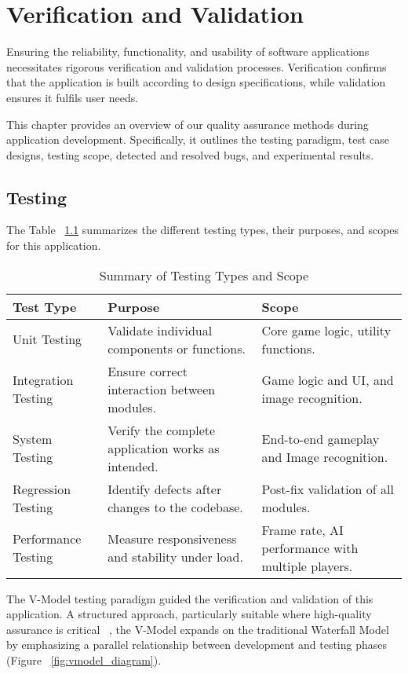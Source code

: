 \chapter{Verification and Validation}
\label{chap:verification-and-validation}

Ensuring the reliability, functionality, and usability of software applications necessitates rigorous verification and validation processes. Verification confirms that the application is built according to design specifications, while validation ensures it fulfils user needs.

This chapter provides an overview of our quality assurance methods during application development. Specifically, it outlines the testing paradigm, test case designs, testing scope, detected and resolved bugs, and experimental results.

\section{Testing}
The Table ~\ref{tab:testing_summary} summarizes the different testing types, their purposes, and scopes for this application.

\begin{table}[ht!]
    \centering
    \caption{Summary of Testing Types and Scope}
    \label{tab:testing_summary}
    \begin{tabular}{|p{4cm}|p{4cm}|p{4cm}|}
    \hline
    \textbf{Test Type} & \textbf{Purpose} & \textbf{Scope} \\ \hline
    Unit Testing       & Validate individual components or functions. & Core game logic, utility functions. \\ \hline
    Integration Testing & Ensure correct interaction between modules. & Game logic and UI, and image recognition. \\ 
    \hline
    System Testing     & Verify the complete application works as intended. & End-to-end gameplay and Image recognition. \\ \hline
    Regression Testing & Identify defects after changes to the codebase. & Post-fix validation of all modules. \\ \hline
    Performance Testing & Measure responsiveness and stability under load. & Frame rate, AI performance with multiple players. \\ \hline
    \end{tabular}
\end{table}

The V-Model testing paradigm guided the verification and validation of this application. A structured approach, particularly suitable where high-quality assurance is critical ~\cite{bib:vmodel}, the V-Model expands on the traditional Waterfall Model by emphasizing a parallel relationship between development and testing phases (Figure ~\ref{fig:vmodel_diagram}). 

